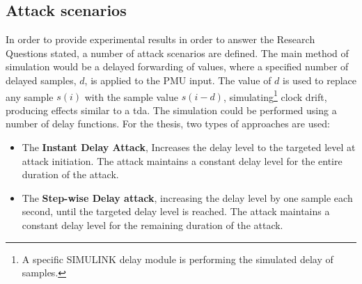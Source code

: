 


\subsection{Attack scenarios}
In order to provide experimental results in order to answer the Research Questions stated, a number of attack scenarios are defined.
The main method of simulation would be a delayed forwarding of values, where a specified number of delayed samples, $d$, is applied to the PMU input. The value of $d$ is used to replace any sample $s(i)$ with the sample value $s(i-d)$, simulating\footnote{A specific SIMULINK delay module is performing the simulated delay of samples.} clock drift, producing effects similar to a \acrlong{tda}.
The simulation could be performed using a number of delay functions. For the thesis, two types of approaches are used:
\begin{itemize}
    \item The \textbf{Instant Delay Attack}, Increases the delay level to the targeted level at attack initiation. The attack maintains a constant delay level for the entire duration of the attack. 
    \item The \textbf{Step-wise Delay attack}, increasing the delay level by one sample each second, until the targeted delay level is reached. The attack maintains a constant delay level for the remaining duration of the attack.
\end{itemize}

